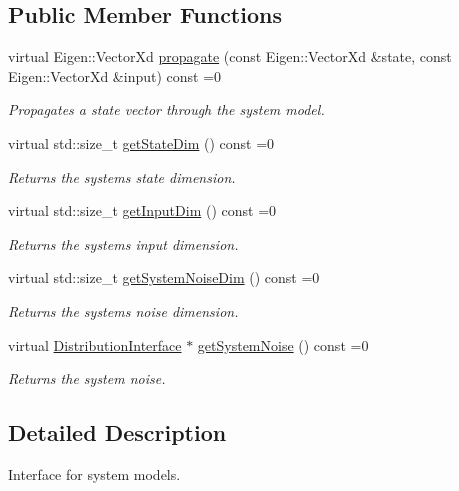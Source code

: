 \subsection*{Public Member Functions}
\begin{DoxyCompactItemize}
\item 
virtual Eigen\+::\+Vector\+Xd \hyperlink{classrefill_1_1SystemModelBase_a92d2c65291b3086f810e362cf4194eb0}{propagate} (const Eigen\+::\+Vector\+Xd \&state, const Eigen\+::\+Vector\+Xd \&input) const =0
\begin{DoxyCompactList}\small\item\em Propagates a state vector through the system model. \end{DoxyCompactList}\item 
virtual std\+::size\+\_\+t \hyperlink{classrefill_1_1SystemModelBase_ae51c98bc767eb19e6764fdcf52f0bea9}{get\+State\+Dim} () const =0
\begin{DoxyCompactList}\small\item\em Returns the systems state dimension. \end{DoxyCompactList}\item 
virtual std\+::size\+\_\+t \hyperlink{classrefill_1_1SystemModelBase_ade51fae436fc40614090566abce36544}{get\+Input\+Dim} () const =0
\begin{DoxyCompactList}\small\item\em Returns the systems input dimension. \end{DoxyCompactList}\item 
virtual std\+::size\+\_\+t \hyperlink{classrefill_1_1SystemModelBase_a7d591e69b86dbec48beb9b2022e30e32}{get\+System\+Noise\+Dim} () const =0
\begin{DoxyCompactList}\small\item\em Returns the systems noise dimension. \end{DoxyCompactList}\item 
virtual \hyperlink{classrefill_1_1DistributionInterface}{Distribution\+Interface} $\ast$ \hyperlink{classrefill_1_1SystemModelBase_a54bc6320db72f18aeff35598a4bee3a1}{get\+System\+Noise} () const =0
\begin{DoxyCompactList}\small\item\em Returns the system noise. \end{DoxyCompactList}\end{DoxyCompactItemize}


\subsection{Detailed Description}
Interface for system models. 

